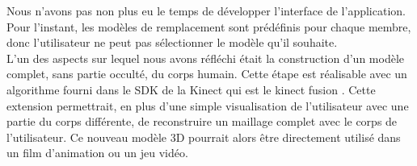 Nous n'avons pas non plus eu le temps de développer l'interface de l'application. Pour l'instant, les modèles de remplacement
sont prédéfinis pour chaque membre, donc l'utilisateur ne peut pas sélectionner le modèle qu'il souhaite.\\

L'un des aspects sur lequel nous avons réfléchi était la construction d'un modèle complet, sans partie occulté, du corps
humain. Cette étape est réalisable avec un algorithme fourni dans le SDK de la Kinect qui est le \og kinect fusion \fg\cite{
KinectFusion}. Cette extension permettrait, en plus d'une simple visualisation de l'utilisateur avec une partie du corps
différente, de reconstruire un maillage complet avec le corps de l'utilisateur. Ce nouveau modèle 3D pourrait alors être
directement utilisé dans un film d'animation ou un jeu vidéo.
